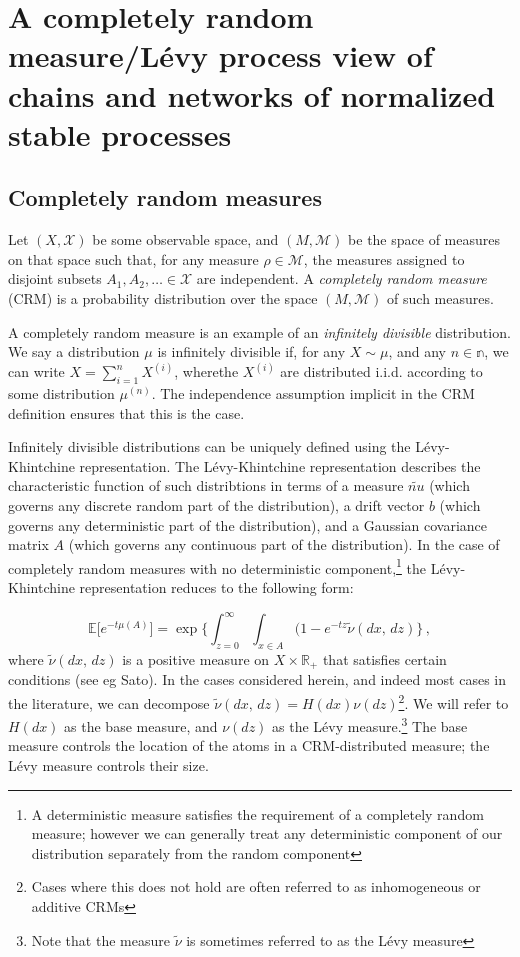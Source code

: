 
\section{A completely random measure/L\'{e}vy process view of chains and networks of normalized stable processes}

\subsection{Completely random measures}
Let $(X,\mathcal{X})$ be some observable space, and $(M,\mathcal{M})$ be the space of measures on that space such that, for any measure $\rho\in\mathcal{M}$, the measures assigned to disjoint subsets $A_1,A_2,\dots \in\mathcal{X}$ are independent. A \emph{completely random measure} (CRM) is a probability distribution over the space $(M,\mathcal{M})$ of such measures.

A completely random measure is an example of an \emph{infinitely divisible} distribution. We say a distribution $\mu$ is infinitely divisible if, for any $X\sim\mu$, and any $n\in\mathbb{n}$, we can write $X = \sum_{i=1}^{n}X^{(i)}$, wherethe $X^{(i)}$ are distributed i.i.d. according to some distribution $\mu^{(n)}$. The independence assumption implicit in the CRM definition ensures that this is the case.

Infinitely divisible distributions can be uniquely defined using the L\'{e}vy-Khintchine representation. The L\'{e}vy-Khintchine representation describes the characteristic function of such distribtions in terms of a measure $\tilde{nu}$ (which governs any discrete random part of the distribution), a drift vector $b$ (which governs any deterministic part of the distribution), and a Gaussian covariance matrix $A$ (which governs any continuous part of the distribution). In the case of completely random measures with no deterministic component,\footnote{A deterministic measure satisfies the requirement of a completely random measure; however we can generally treat any deterministic component of our distribution separately from the random component} the L\'{e}vy-Khintchine representation reduces to the following form:

\begin{equation*}
\mathbb{E}\bigg[e^{-t\mu(A)}\bigg] = \exp\bigg\{ \int_{z=0}^\infty\int_{x\in A}(1-e^{-tz}\tilde{\nu}(dx,\,dz)\bigg\}\, ,
\end{equation*}
where $\tilde{\nu}(dx,\,dz)$ is a positive measure on $X \times \mathbb{R}_+$ that satisfies certain conditions (see eg Sato). In the cases considered herein, and indeed most cases in the literature, we can decompose  $\tilde{\nu}(dx,\,dz) = H(dx)\nu(dz)$\footnote{Cases where this does not hold are often referred to as inhomogeneous or additive CRMs}. We will refer to $H(dx)$ as the base measure, and $\nu(dz)$ as the L\'{e}vy measure.\footnote{Note that the measure $\tilde{\nu}$ is sometimes referred to as the L\'{e}vy measure} The base measure controls the location of the atoms in a CRM-distributed measure; the L\'{e}vy measure controls their size.

